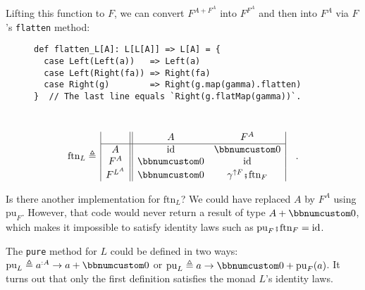 \noindent Lifting this function to $F$, we can convert $F^{A+F^{A}}$
into $F^{F^{A}}$ and then into $F^{A}$ via $F$\textsf{'}s \lstinline!flatten!
method:

\begin{wrapfigure}{l}{0.58\columnwidth}%
\vspace{-0.1\baselineskip}
\begin{lstlisting}
def flatten_L[A]: L[L[A]] => L[A] = {
  case Left(Left(a))   => Left(a)
  case Left(Right(fa)) => Right(fa)
  case Right(g)        => Right(g.map(gamma).flatten)
}  // The last line equals `Right(g.flatMap(gamma))`.
\end{lstlisting}

\vspace{-3\baselineskip}
\end{wrapfigure}%

~\vspace{-0.95\baselineskip}
\[
\text{ftn}_{L}\triangleq\,\begin{array}{|c||cc|}
 & A & F^{A}\\
\hline A & \text{id} & \bbnum 0\\
F^{A} & \bbnum 0 & \text{id}\\
F^{L^{A}} & \bbnum 0 & \gamma^{\uparrow F}\bef\text{ftn}_{F}
\end{array}\quad.
\]

Is there another implementation for $\text{ftn}_{L}$? We could have
replaced $A$ by $F^{A}$ using $\text{pu}_{F}$. However, that code
would never return a result of type $A+\bbnum 0$, which makes it
impossible to satisfy identity laws such as $\text{pu}_{F}\bef\text{ftn}_{F}=\text{id}$.

The \lstinline!pure! method for $L$ could be defined in two ways:
$\text{pu}_{L}\triangleq a^{:A}\rightarrow a+\bbnum 0$ or $\text{pu}_{L}\triangleq a\rightarrow\bbnum 0+\text{pu}_{F}(a)$.
It turns out that only the first definition satisfies the monad $L$\textsf{'}s
identity laws.

